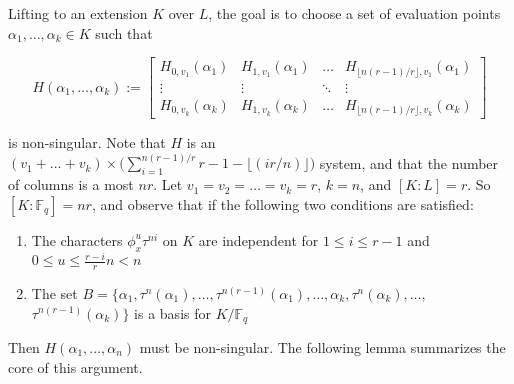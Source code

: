 \documentclass[sigconf]{acmart}
\newcommand{\F}{\mathbb{F}}
\begin{document}
Lifting to an extension $K$ over $L$, the goal is to choose a set of evaluation points $\alpha_1, \ldots, \alpha_k \in K$ such that

\begin{equation*}
    H(\alpha_1, \ldots, \alpha_k) := \begin{bmatrix}
H_{0,v_1}(\alpha_1) & H_{1, v_1}(\alpha_1) & \ldots & H_{\lfloor n (r-1)/r \rfloor, v_1}(\alpha_1) \\ \vdots & \vdots & \ddots & \vdots \\ H_{0,v_k}(\alpha_k) & H_{1, v_k}(\alpha_k) & \ldots & H_{\lfloor n (r-1)/r\rfloor, v_k}(\alpha_k)
\end{bmatrix}
\end{equation*}

is non-singular. Note that $H$ is an $ (v_1 + \ldots + v_k) \times \bigg( \sum_{i=1}^{n(r-1)/r} r - 1 - \lfloor(i r/n) \rfloor \bigg)$ system, and that the number of columns is a most $nr$. Let $v_1 = v_2 = \ldots = v_k = r$, $k = n$, and $[K:L] = r$. So $[K:\F_q] = nr$, and observe that if the following two conditions are satisfied:

\begin{enumerate}
    \item The characters $\phi_x^{u}\tau^{ni}$ on $K$ are independent for $1 \leq i \leq r-1$ and $0 \leq u \leq  \frac{r-i}{r} n < n$ 
    \item The set $B = \{\alpha_1, \tau^n(\alpha_1), \ldots , \tau^{n(r - 1)}(\alpha_1), \ldots , \alpha_k, \tau^n(\alpha_k), \ldots , $
    $\tau^{n(r - 1)}(\alpha_k) \}$ is a basis for $K/\F_q$
\end{enumerate} 

Then $H(\alpha_1, \ldots, \alpha_{n})$ must be non-singular. The following lemma summarizes the core of this argument.
\end{document}
